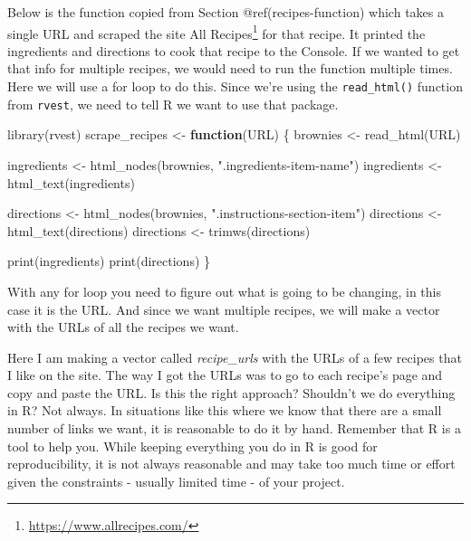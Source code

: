 \documentclass[
  a4paper,
]{krantz}
\makeatletter
\newenvironment{Shaded}{\begin{snugshade}}{\end{snugshade}}
\newcommand{\ControlFlowTok}[1]{\textcolor[rgb]{0.13,0.29,0.53}{\textbf{#1}}}
\newcommand{\FunctionTok}[1]{\textcolor[rgb]{0.00,0.00,0.00}{#1}}
\newcommand{\NormalTok}[1]{#1}
\newcommand{\OtherTok}[1]{\textcolor[rgb]{0.56,0.35,0.01}{#1}}
\newcommand{\StringTok}[1]{\textcolor[rgb]{0.31,0.60,0.02}{#1}}
\renewcommand{\href}[2]{#2\footnote{\url{#1}}}
\newenvironment{kframe}{%
\medskip{}
\setlength{\fboxsep}{.8em}
 \def\at@end@of@kframe{}%
 \ifinner\ifhmode%
  \def\at@end@of@kframe{\end{minipage}}%
  \begin{minipage}{\columnwidth}%
 \fi\fi%
 \def\FrameCommand##1{\hskip\@totalleftmargin \hskip-\fboxsep
 \colorbox{shadecolor}{##1}\hskip-\fboxsep
     \hskip-\linewidth \hskip-\@totalleftmargin \hskip\columnwidth}%
 \MakeFramed {\advance\hsize-\width
   \@totalleftmargin\z@ \linewidth\hsize
   \@setminipage}}%
 {\par\unskip\endMakeFramed%
 \at@end@of@kframe}
\renewenvironment{Shaded}{\begin{kframe}}{\end{kframe}}
\makeatother
\begin{document}
Below is the function copied from Section
@ref(recipes-function) which takes a single URL and scraped
the site \href{https://www.allrecipes.com/}{All Recipes} for
that recipe. It printed the ingredients and directions to
cook that recipe to the Console. If we wanted to get that
info for multiple recipes, we would need to run the function
multiple times. Here we will use a for loop to do this.
Since we're using the \texttt{read\_html()} function from
\texttt{rvest}, we need to tell R we want to use that
package.

\begin{Shaded}
\begin{Highlighting}[]
\FunctionTok{library}\NormalTok{(rvest)}
\NormalTok{scrape\_recipes }\OtherTok{\textless{}{-}} \ControlFlowTok{function}\NormalTok{(URL) \{}
\NormalTok{  brownies }\OtherTok{\textless{}{-}} \FunctionTok{read\_html}\NormalTok{(URL)}

\NormalTok{  ingredients }\OtherTok{\textless{}{-}} \FunctionTok{html\_nodes}\NormalTok{(brownies, }\StringTok{".ingredients{-}item{-}name"}\NormalTok{)}
\NormalTok{  ingredients }\OtherTok{\textless{}{-}} \FunctionTok{html\_text}\NormalTok{(ingredients)}

\NormalTok{  directions }\OtherTok{\textless{}{-}} \FunctionTok{html\_nodes}\NormalTok{(brownies, }\StringTok{".instructions{-}section{-}item"}\NormalTok{)}
\NormalTok{  directions }\OtherTok{\textless{}{-}} \FunctionTok{html\_text}\NormalTok{(directions)}
\NormalTok{  directions }\OtherTok{\textless{}{-}} \FunctionTok{trimws}\NormalTok{(directions)}

  \FunctionTok{print}\NormalTok{(ingredients)}
  \FunctionTok{print}\NormalTok{(directions)}
\NormalTok{\}}
\end{Highlighting}
\end{Shaded}

With any for loop you need to figure out what is going to be
changing, in this case it is the URL. And since we want
multiple recipes, we will make a vector with the URLs of all
the recipes we want.

Here I am making a vector called \emph{recipe\_urls} with
the URLs of a few recipes that I like on the site. The way I
got the URLs was to go to each recipe's page and copy and
paste the URL. Is this the right approach? Shouldn't we do
everything in R? Not always. In situations like this where
we know that there are a small number of links we want, it
is reasonable to do it by hand. Remember that R is a tool to
help you. While keeping everything you do in R is good for
reproducibility, it is not always reasonable and may take
too much time or effort given the constraints - usually
limited time - of your project.
\end{document}
